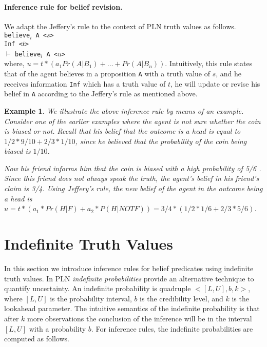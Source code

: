 \documentclass[12pt]{article}
\newtheorem{example}[theorem]{Example}
\begin{document}
\paragraph{Inference rule for belief revision.} We adapt the Jeffery's rule \cite{Jeffrey1983} to the context of PLN truth values as follows.\\

\noindent \texttt{believe$_i$ A <$s$>}\\
\noindent \texttt{Inf <$t$>}\\
$\vdash$
\noindent \texttt{believe$_i$ A <$u$>}\\

where, $u=t*(a_1 Pr(A|B_1) + \ldots + Pr(A|B_n))$. Intuitively, this rule states that of the agent believes in a proposition \texttt{A} with a truth value of $s$, and he receives information \texttt{Inf} which has a truth value of $t$, he will update or revise his belief in \texttt{A} according to the Jeffery's rule as mentioned above. 

\begin{example}{\em We illustrate the above inference rule by means of an example. Consider one of the earlier examples where the agent is not sure whether the coin is biased or not. Recall that his belief that the outcome is a head is equal to $1/2*9/10 + 2/3*1/10$, since he believed that the probability of the coin being biased is $1/10$.

 Now his friend informs him that the coin is biased with a high probability of 5/6 . Since this friend does not always speak the truth, the agent's belief in his friend's claim is 3/4. Using Jeffery's rule, the new belief of the agent in the outcome being a head is $u= t* (a_1*Pr(H|F)+a_2*P(H| NOT F)) = 3/4 * (1/2*1/6 + 2/3*5/6) $.
}
\end{example}

\section{Indefinite Truth Values} In this section we introduce inference rules for belief predicates using  indefinite truth values. In PLN \emph{indefinite probabilities} provide an alternative technique to quantify  uncertainty. An indefinite probability is quadruple $<[L,U],b,k>$, where $[L,U]$ is the probability interval,  $b$ is the  credibility level, and $k$ is the lookahead parameter. The intuitive semantics of the indefinite probability is that after $k$ more observations the conclusion of the inference will be in the interval $[L,U]$ with a probability $b$. For inference rules, the indefinite probabilities are computed as follows.
\end{document}
